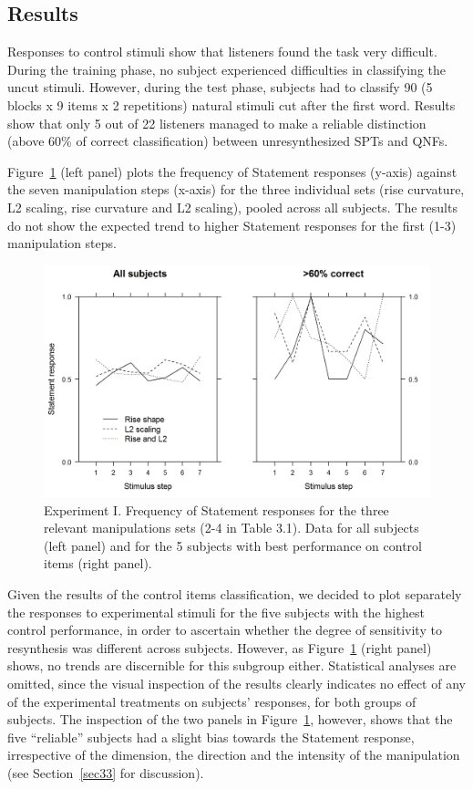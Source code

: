 \subsection{Results}\label{sec322}
Responses to control stimuli show that listeners found the task very difficult. During the training phase, no subject experienced difficulties in classifying the uncut stimuli. However, during the test phase, subjects had to classify 90 (5 blocks x 9 items x 2 repetitions) natural stimuli cut after the first word. Results show that only 5 out of 22 listeners managed to make a reliable distinction (above 60\% of correct classification) between unresynthesized SPTs and QNFs.

Figure~\ref{fig305} (left panel) plots the frequency of Statement responses (y-axis) against the seven manipulation steps (x-axis) for the three individual sets (rise curvature, L2 scaling, rise curvature and L2 scaling), pooled across all subjects. The results do not show the expected trend to higher Statement responses for the first (1-3) manipulation steps. 

\begin{figure}[hbpt]
\centering
\includegraphics[height=.3\textheight]{images/305.png}
\caption{Experiment I. Frequency of Statement responses for the three relevant manipulations sets (2-4 in Table 3.1). Data for all subjects (left panel) and for the 5 subjects with best performance on control items (right panel).}
\label{fig305}\end{figure}

Given the results of the control items classification, we decided to plot separately the responses to experimental stimuli for the five subjects with the highest control performance, in order to ascertain whether the degree of sensitivity to resynthesis was different across subjects. However, as Figure~\ref{fig305} (right panel) shows, no trends are discernible for this subgroup either. Statistical analyses are omitted, since the visual inspection of the results clearly indicates no effect of any of the experimental treatments on subjects' responses, for both groups of subjects. The inspection of the two panels in Figure~\ref{fig305}, however, shows that the five ``reliable'' subjects had a slight bias towards the Statement response, irrespective of the dimension, the direction and the intensity of the manipulation (see Section~\ref{sec33} for discussion).

